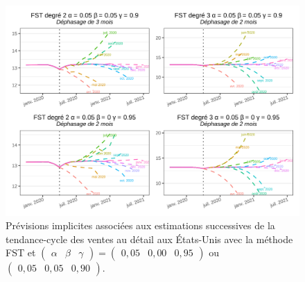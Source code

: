 \documentclass[
  12pt,
  a4paper,french]{article}
\newcommand\1{\mathds{1}}
\begin{document}
\begin{figure}

{\centering \includegraphics[width=0.9\linewidth]{img/nber/retailx_fstp1_implicit_forecast} 

}

\caption[Prévisions implicites associées aux estimations successives de la tendance-cycle des ventes au détail aux États-Unis avec la méthode FST et \(\begin{pmatrix}\alpha&\beta&\gamma\end{pmatrix} = \begin{pmatrix}0,05 &0,00&0,95\end{pmatrix}\) ou \(\begin{pmatrix}0,05 &0,05&0,90\end{pmatrix}\)]{Prévisions implicites associées aux estimations successives de la tendance-cycle des ventes au détail aux États-Unis avec la méthode FST et \(\begin{pmatrix}\alpha&\beta&\gamma\end{pmatrix} = \begin{pmatrix}0,05 &0,00&0,95\end{pmatrix}\) ou \(\begin{pmatrix}0,05 &0,05&0,90\end{pmatrix}\).}\label{fig:retailxipfst1}

\footnotesize
\normalsize\end{figure}
\end{document}
